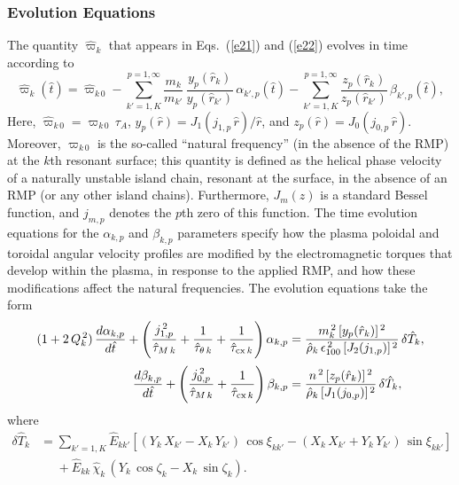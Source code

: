 \documentclass[12pt,prb,aps]{revtex4-1}
\begin{document}
\subsubsection{Evolution Equations}
The quantity $\hat{\varpi}_k$ that appears in Eqs.~(\ref{e21}) and (\ref{e22}) evolves in time according to
\begin{equation}\label{e19a}
\hat{\varpi}_k(\hat{t})= \hat{\varpi}_{k\,0}-\sum_{k'=1,K}^{p=1,\infty} \frac{m_k}{m_{k'}}\,\frac{y_p(\hat{r}_k)}{y_p(\hat{r}_{k'})}\,\alpha_{k',p}(\hat{t})-\sum_{k'=1,K}^{p=1,\infty}\frac{z_p(\hat{r}_k)}{z_p(\hat{r}_{k'})}\,\beta_{k',p}(\hat{t}),
\end{equation}
Here, $\hat{\varpi}_{k\,0}= \varpi_{k\,0}\,\tau_A$, $y_p(\hat{r})=J_1(j_{1,p}\,\hat{r})/\hat{r}$, and $z_p(\hat{r})=J_0(j_{0,p}\,\hat{r})$. Moreover, $\varpi_{k\,0}$
is the so-called ``natural frequency''  (in the absence of the RMP) at the $k$th resonant surface; this quantity is defined as the helical phase velocity of a naturally unstable island chain, resonant at the surface, in the
absence of an RMP (or any other island chains). Furthermore, $J_m(z)$ is a standard Bessel function, and $j_{m,p}$ denotes the $p$th zero of this function. 
The time evolution equations for the $\alpha_{k,p}$ and $\beta_{k,p}$ parameters specify how the
plasma poloidal and toroidal angular velocity profiles are modified by the electromagnetic torques that develop within the plasma, in response to the applied
RMP, and how these modifications affect the natural frequencies. The evolution equations take the form
\begin{align}
(1+2\,Q_k^{\,2})\,\frac{d\alpha_{k,p}}{d\hat{t}}+ \left(\frac{j_{1,p}^{\,2}}{\hat{\tau}_{M\,k}}+\frac{1}{\hat{\tau}_{\theta\,k}}+\frac{1}{\hat{\tau}_{{\rm cx}\,k}}\right)\alpha_{k,p}&=
\frac{m_k^{\,2}\,[y_p(\hat{r}_k)]^{\,2}}{\hat{\rho}_k\,\epsilon_{100}^{\,2}\,[J_2(j_{1,p})]^{\,2}}\,\delta\hat{T}_k,\\[0.5ex]
\frac{d\beta_{k,p}}{d\hat{t}}+ \left(\frac{j_{0,p}^{\,2}}{\hat{\tau}_{M\,k}}+\frac{1}{\hat{\tau}_{{\rm cx}\,k}}\right)\beta_{k,p}&=
\frac{n^{\,2}\,[z_p(\hat{r}_k)]^{\,2}}{\hat{\rho}_k\,[J_1(j_{0,p})]^{\,2}}\,\delta\hat{T}_k,
\end{align}
where
\begin{align}\label{e24a}
\delta \hat{T}_k&= \sum_{k'=1,K}\hat{E}_{kk'}\left[(Y_k\,X_{k'}-X_k\,Y_{k'})\,\cos\xi_{kk'}- (X_k\,X_{k'}+Y_k\,Y_{k'})\,\sin\xi_{kk'}\right]\nonumber\\[0.5ex]
&\phantom{=}+\hat{E}_{kk}\,\hat{\chi}_k\,(Y_k\,\cos\zeta_k-X_k\,\sin\zeta_k).
\end{align}
\end{document}
